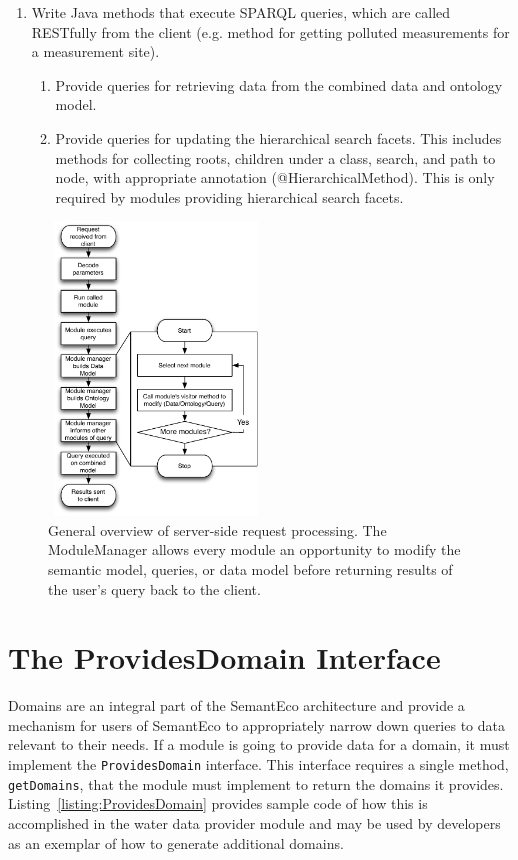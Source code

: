 \documentclass[letterpaper]{report}
\begin{document}
\begin{enumerate}
\begin{enumerate}
\end{enumerate}
\item Write Java methods that execute SPARQL queries, which are called RESTfully from the client (e.g. method for getting polluted measurements for a measurement site).
\begin{enumerate}%
\item Provide queries for retrieving data from the combined data and ontology model.
\item Provide queries for updating the hierarchical search facets. This includes methods for collecting roots, children under a class, search, and path to node, with appropriate annotation (@HierarchicalMethod). This is only required by modules providing hierarchical search facets.
\end{enumerate}
\end{enumerate}

\begin{figure}\begin{center}
\includegraphics[width=57mm, height=78mm]{ExecutionFlow.pdf}
\caption{General overview of server-side request processing. The ModuleManager allows every module an opportunity to modify the semantic model, queries, or data model before returning results of the user's query back to the client.}
\label{execution-flow}
\end{center}\end{figure}

\section{The ProvidesDomain Interface}
Domains are an integral part of the SemantEco architecture and provide a mechanism for users of SemantEco to appropriately narrow down queries to data relevant to their needs. If a module is going to provide data for a domain, it must implement the \texttt{ProvidesDomain} interface. This interface requires a single method, \texttt{getDomains}, that the module must implement to return the domains it provides. Listing~\ref{listing:ProvidesDomain} provides sample code of how this is accomplished in the water data provider module and may be used by developers as an exemplar of how to generate additional domains.
\end{document}
